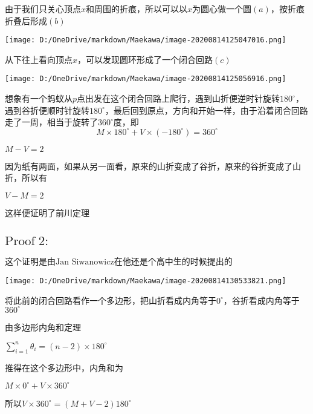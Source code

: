 \documentclass[a4paper,12pt]{article}
\begin{document}
由于我们只关心顶点$x$和周围的折痕，所以可以以$x$为圆心做一个圆$(a)$，按折痕折叠后形成$(b)$\\

\begin{center}
\texttt{[image: D:/OneDrive/markdown/Maekawa/image-20200814125047016.png]}\\
\end{center}

从下往上看向顶点$x$，可以发现圆环形成了一个闭合回路$(c)$

\begin{center}
    \texttt{[image: D:/OneDrive/markdown/Maekawa/image-20200814125056916.png]}
\end{center}


想象有一个蚂蚁从$p$点出发在这个闭合回路上爬行，遇到山折便逆时针旋转$180^{\circ}$，遇到谷折便顺时针旋转$180^{\circ}$，最后回到原点，方向和开始一样，由于沿着闭合回路走了一周，相当于旋转了$360^{\circ}$度，即
\begin{equation}\label{3}
    M \times 180^{\circ} +V \times (-180^{\circ}) = 360^{\circ}
\end{equation}


$M - V = 2$

因为纸有两面，如果从另一面看，原来的山折变成了谷折，原来的谷折变成了山折，所以有

$V - M = 2$

这样便证明了前川定理

\subsection{$\text{Proof}\;2:$}

这个证明是由$\text{Jan Siwanowicz}$在他还是个高中生的时候提出的
\begin{center}
\texttt{[image: D:/OneDrive/markdown/Maekawa/image-20200814130533821.png]}\\
\end{center}

将此前的闭合回路看作一个多边形，把山折看成内角等于$0^{\circ}$，谷折看成内角等于$360^{\circ}$

由多边形内角和定理

$\sum\limits_{i=1}^n\theta_i=(n-2)×180^{\circ}$

推得在这个多边形中，内角和为

$M \times 0^{\circ} +V \times 360^{\circ}$

所以$V\times 360^{\circ} = (M +V-2)180^{\circ}$
\end{document}

